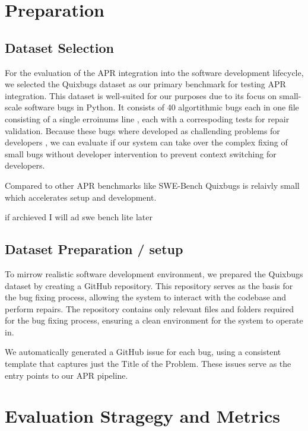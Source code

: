 \section{Preparation}
\subsection{Dataset Selection}
For the evaluation of the APR integration into the software development lifecycle, we selected the Quixbugs dataset \cite{linQuixBugsMultilingualProgram2017} as our primary benchmark for testing APR integration. This dataset is well-suited for our purposes due to its focus on small-scale software bugs in Python. It consists of 40 algortithmic bugs each in one file consisting of a single erroinums line , each with a correspoding tests for repair validation. Because these bugs where developed as challending problems for developers \cite{linQuixBugsMultilingualProgram2017}, we can evaluate if our system can take over the complex fixing of small bugs without developer intervention to prevent context switching for developers.

Compared to other APR benchmarks like SWE-Bench \cite{jimenezSWEbenchCanLanguage2024} Quixbugs is relaivly small which accelerates setup and development.

if archieved I will ad swe bench lite later \cite{jimenezSWEbenchCanLanguage2024}

\subsection{Dataset Preparation / setup}
To mirrow realistic software development environment, we prepared the Quixbugs dataset by creating a GitHub repository. This repository serves as the basis for the bug fixing process, allowing the system to interact with the codebase and perform repairs. The repository contains only relevant files and folders required for the bug fixing process, ensuring a clean environment for the system to operate in.

We automatically generated a GitHub issue for each bug, using a consistent template that captures just the Title of the Problem. These issues serve as the entry points to our APR pipeline.

\section{Evaluation Stragegy and Metrics}

